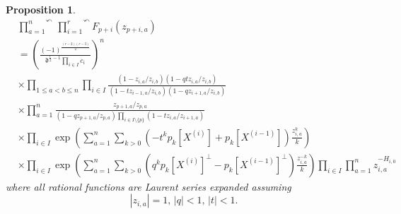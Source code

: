 \documentclass{amsart}
\newcommand{\ddd}{\mathfrak{d}}
\newtheorem{prop}[thm]{Proposition}
\theoremstyle{remark}
\numberwithin{thm}{section}
\numberwithin{equation}{section}
\begin{document}
\begin{prop}
\begin{equation}
\begin{aligned}
&\overset{\curvearrowleft}{\prod_{a=1}^n}\,\overset{\curvearrowleft}{\prod_{i=1}^{r}}F_{p+i}(z_{p+i,a})\\
&=\left( \frac{(-1)^{\frac{(r-2)(r-3)}{2}}}{\displaystyle\ddd^{\frac{r}{2}-1} \prod_{i\in I} c_i}\right)^n\\
&\times\prod_{1\le a<b\le n}\prod_{i\in I}
\frac{\left(1-z_{i,a}/z_{i,b}\right)\left(1-qtz_{i,a}/z_{i,b}\right)}{\left(1-tz_{i-1,a}/z_{i,b}\right)\left(1-qz_{i+1,a}/z_{i,b}\right)}\\
&\times \prod_{a=1}^n\frac{z_{p+1,a}/z_{p,a}}{\left(1-qz_{p+1,a}/z_{p,a}\right)
\prod_{i\in I\setminus\{p\}}
\left(1-tz_{i,a}/z_{i+1,a}\right)}\\
&\times\prod_{i\in I}\exp\left(\sum_{a=1}^n\sum_{k>0}\left(-t^{k}p_{k}[X^{(i)}]+p_k[X^{(i-1)}]\right)\frac{z_{i,a}^{k}}{k}\right)\\
&\times\prod_{i\in I}\exp\left(\sum_{a=1}^n\sum_{k>0}\left(q^{k}p_{k}[X^{(i)}]^\perp-p_k[X^{(i-1)}]^\perp\right)\frac{z_{i,a}^{-k}}{k}\right)
\prod_{i\in I}\prod_{a=1}^n z_{i,a}^{-H_{i,0}}
\end{aligned}
\label{FNormalOrder}
\end{equation}
where all rational functions are Laurent series expanded assuming 
\begin{equation}
|z_{i,a}|=1,\, |q|< 1,\, |t|<1.
\label{NormalFExpand}
\end{equation}
\end{prop}
\end{document}
